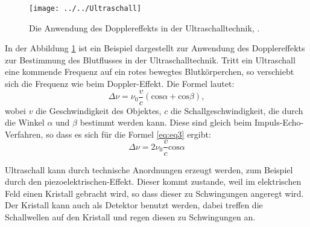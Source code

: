 \begin{figure}[h!]
	\centering
	\texttt{[image: ../../Ultraschall]}
	\caption{Die Anwendung des Dopplereffekts in der Ultraschalltechnik, \cite[1]{anleitungUS3}.}
	\label{fig:ultraschall}
\end{figure}
In der Abbildung \ref{fig:ultraschall} ist ein Beispiel dargestellt zur Anwendung des Dopplereffekts zur Bestimmung des Blutflusses in der Ultraschalltechnik. 
Tritt ein Ultraschall eine kommende Frequenz auf ein rotes bewegtes Blutkörperchen, so verschiebt sich die Frequenz wie beim Doppler-Effekt.
Die Formel lautet:
\begin{equation}
\label{eq:eq3}
\Delta \nu = \nu_0 \frac{v}{c}(\text{cos}\alpha + \text{cos}\beta),
\end{equation}
wobei $v$ die Geschwindigkeit des Objektes, $c$ die Schallgeschwindigkeit, die durch die Winkel $\alpha$ und $\beta$ bestimmt werden kann. 
Diese sind gleich beim Impuls-Echo-Verfahren, so dass es sich für die Formel \ref{eq:eq3} ergibt:
\begin{equation}
\label{eq:eq4}
\Delta \nu = 2 \nu_0 \frac{v}{c} \text{cos}\alpha
\end{equation}

Ultraschall kann durch technische Anordnungen erzeugt werden, zum Beispiel durch den piezoelektrischen-Effekt. Dieser kommt zustande, weil im elektrischen Feld einen Kristall gebracht wird, so dass dieser zu Schwingungen angeregt wird. Der Kristall kann auch als Detektor benutzt werden, dabei treffen die Schallwellen auf den Kristall und regen diesen zu Schwingungen an.